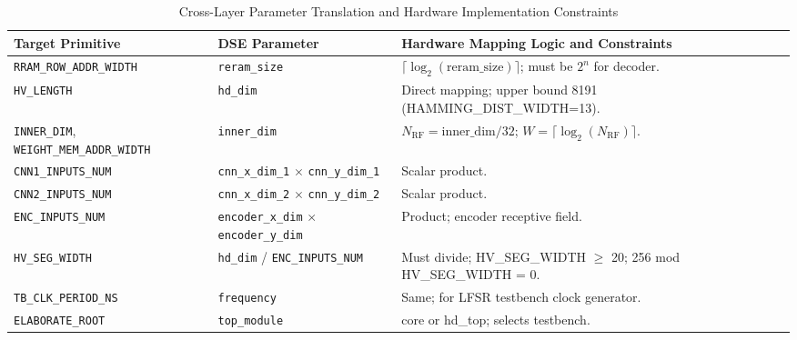 \begin{table}[htbp]
\centering
\caption{Cross-Layer Parameter Translation and Hardware Implementation Constraints}
\label{tab:conversion_formulas}
\begin{tabularx}{\textwidth}{@{}l l X @{}}
\toprule
\textbf{Target Primitive} & \textbf{DSE Parameter} & \textbf{Hardware Mapping Logic and Constraints} \\ \midrule
\texttt{RRAM\_ROW\_ADDR\_WIDTH} & \texttt{reram\_size} & $\lceil \log_2(\text{reram\_size}) \rceil$; must be $2^n$ for decoder. \\ \addlinespace
\texttt{HV\_LENGTH}       & \texttt{hd\_dim}     & Direct mapping; upper bound 8191 (HAMMING\_DIST\_WIDTH=13). \\ \addlinespace
\texttt{INNER\_DIM}, \texttt{WEIGHT\_MEM\_ADDR\_WIDTH} & \texttt{inner\_dim}  & $N_{\text{RF}} = \text{inner\_dim} / 32$; $W = \lceil \log_2(N_{\text{RF}}) \rceil$. \\ \addlinespace
\texttt{CNN1\_INPUTS\_NUM} & \texttt{cnn\_x\_dim\_1} $\times$ \texttt{cnn\_y\_dim\_1} & Scalar product. \\ \addlinespace
\texttt{CNN2\_INPUTS\_NUM} & \texttt{cnn\_x\_dim\_2} $\times$ \texttt{cnn\_y\_dim\_2} & Scalar product. \\ \addlinespace
\texttt{ENC\_INPUTS\_NUM} & \texttt{encoder\_x\_dim} $\times$ \texttt{encoder\_y\_dim} & Product; encoder receptive field. \\ \addlinespace
\texttt{HV\_SEG\_WIDTH} & \texttt{hd\_dim} / \texttt{ENC\_INPUTS\_NUM} & Must divide; HV\_SEG\_WIDTH $\geq$ 20; 256 mod HV\_SEG\_WIDTH = 0. \\ \addlinespace
\texttt{TB\_CLK\_PERIOD\_NS} & \texttt{frequency}   & Same; for LFSR testbench clock generator. \\ \addlinespace
\texttt{ELABORATE\_ROOT}  & \texttt{top\_module} & core or hd\_top; selects testbench. \\ \bottomrule
\end{tabularx}
\end{table}

